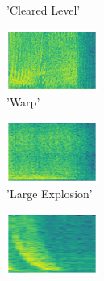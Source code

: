 \begin{figure}[H]
{\begin{subfigure}{0.23\textwidth}
{{        }\hspace*{0.75cm}%
      }%
      \caption*{'Cleared Level'}
    \end{subfigure}
    \begin{subfigure}{0.23\textwidth}
      \includegraphics[width=3cm]{sounds/buttons/10.wav-button.png}%
      \caption*{'Warp'}
    \end{subfigure}
    \begin{subfigure}{0.23\textwidth}
      \includegraphics[width=3cm]{sounds/buttons/11.wav-button.png}%
      \caption*{'Large Explosion'}
    \end{subfigure}
    \begin{subfigure}{0.23\textwidth}
      \includegraphics[width=3cm]{sounds/buttons/12.wav-button.png}%
\end{subfigure}}
\end{figure}
